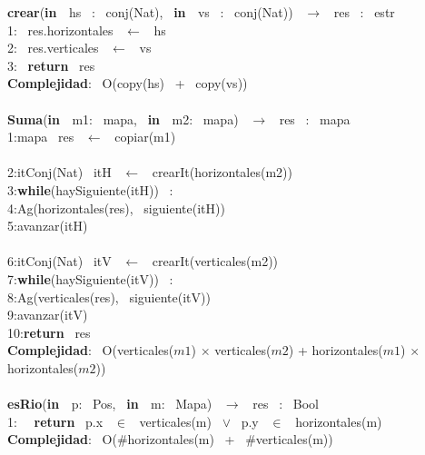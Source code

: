 \begin{Algoritmos}
    
\noindent \noindent\makebox[\linewidth]{\rule{\textwidth}{0.4pt}}
\textbf{crear}(\textbf{in \ }hs \ : \ conj(Nat), \ \textbf{in \ }vs \ : \ conj(Nat)) \ $\longrightarrow$ \ res \ : \ estr\\
1: \ res.horizontales \ $\leftarrow$ \ hs\\
2: \ res.verticales \ $\leftarrow$ \ vs \ \\
3: \ \textbf{return} \ res\\
\textbf{Complejidad}: \ O(copy(hs) \ + \ copy(vs))\\
\makebox[\linewidth]{\rule{\textwidth}{0.4pt}}
\\
\makebox[\linewidth]{\rule{\textwidth}{0.4pt}}
\textbf{Suma}(\textbf{in \ }m1: \ mapa, \ \textbf{in \ }m2: \ mapa) \ $\longrightarrow$ \ res \ : \ mapa\\
1:\indent mapa \ res \ $\leftarrow$ \ copiar(m1)\\
\\
2:\indent itConj(Nat) \ itH \ $\leftarrow$ \ crearIt(horizontales(m2))\\
3:\indent \textbf{while}(haySiguiente(itH)) \ :\\
4:\indent \indent Ag(horizontales(res), \ siguiente(itH))\\
5:\indent \indent avanzar(itH)\\
\\
6:\indent itConj(Nat) \ itV \ $\leftarrow$ \ crearIt(verticales(m2))\\
7:\indent \textbf{while}(haySiguiente(itV)) \ :\\
8:\indent \indent Ag(verticales(res), \ siguiente(itV))\\
9:\indent \indent avanzar(itV)\\
10:\indent \textbf{return} \ res\\
\textbf{Complejidad}: \ O(verticales($m1$) $\times$ verticales($m2$) + horizontales($m1$) $\times$ horizontales($m2$))\\
\makebox[\linewidth]{\rule{\textwidth}{0.4pt}}
\\
\makebox[\linewidth]{\rule{\textwidth}{0.4pt}}
\textbf{esRio}(\textbf{in \ }p: \ Pos, \ \textbf{in \ }m: \ Mapa) \ $\longrightarrow$ \ res \ : \ Bool\\
1: \  \ \textbf{return} \ p.x \ $\in$ \ verticales(m) \ $\vee$ \ p.y \ $\in$ \ horizontales(m)\\
\textbf{Complejidad}: \ O($ \# $horizontales(m) \ + \ $ \# $verticales(m))\\

\end{Algoritmos}
